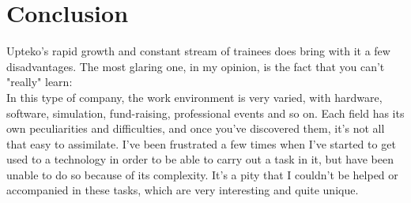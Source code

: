 \chapter*{Conclusion}

Upteko's rapid growth and constant stream of trainees does bring with it a few disadvantages. The most glaring one, in my opinion, is the fact that you can't "really" learn: \\
In this type of company, the work environment is very varied, with hardware, software, simulation, fund-raising, professional events and so on. Each field has its own peculiarities and difficulties, and once you've discovered them, it's not all that easy to assimilate.
I've been frustrated a few times when I've started to get used to a technology in order to be able to carry out a task in it, but have been unable to do so because of its complexity. It's a pity that I couldn't be helped or accompanied in these tasks, which are very interesting and quite unique.

\lipsum[1-2]